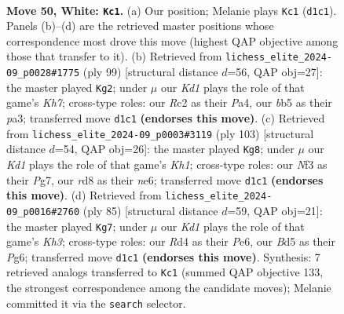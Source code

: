\documentclass[11pt]{article}
\begin{document}
\clearpage

\begin{figure}[p]\centering
\begin{subfigure}{0.46\textwidth}\centering
\resizebox{\linewidth}{!}{%
\newchessgame
\chessboard[
  setfen={3r4/k7/8/1b1B1p1N/1P1R4/4rN2/2R3P1/3K4 w - - 15 50},
  showmover=false,
  pgfstyle=straightmove, color=movearrow, markmove={d1-c1}
]}
\caption{}
\end{subfigure}\hfill
\begin{subfigure}{0.46\textwidth}\centering
\resizebox{\linewidth}{!}{%
\newchessgame
\chessboard[
  setfen={8/8/5R2/8/p1p4R/P1Pb2rp/7k/3K4 b - - 6 50},
  showmover=false,
  pgfstyle=straightmove, color=movearrow, markmove={h2-g2}
]}
\caption{}
\end{subfigure}
\\[4pt]
\begin{subfigure}{0.46\textwidth}\centering
\resizebox{\linewidth}{!}{%
\newchessgame
\chessboard[
  setfen={1R3b1k/5rp1/p3N3/3pn3/7P/8/3B1PK1/8 b - - 1 52},
  showmover=false,
  pgfstyle=straightmove, color=movearrow, markmove={h8-g8}
]}
\caption{}
\end{subfigure}\hfill
\begin{subfigure}{0.46\textwidth}\centering
\resizebox{\linewidth}{!}{%
\newchessgame
\chessboard[
  setfen={2R5/8/4pRpk/3pr3/8/1P6/3K1P2/4r3 b - - 3 43},
  showmover=false,
  pgfstyle=straightmove, color=movearrow, markmove={h6-g7}
]}
\caption{}
\end{subfigure}
\caption{\textbf{Move 50, White: \texttt{Kc1}.} (a) Our position; Melanie plays \texttt{Kc1} (\texttt{d1c1}). Panels (b)--(d) are the retrieved master positions whose correspondence most drove this move (highest QAP objective among those that transfer to it). (b) Retrieved from \texttt{lichess\_elite\_2024-09\_p0028\#1775} (ply 99) [structural distance $d$=56, QAP obj=27]: the master played \texttt{Kg2}; under $\mu$ our \emph{Kd1} plays the role of that game's \emph{Kh7}; cross-type roles: our \emph{R}c2 as their \emph{P}a4, our \emph{b}b5 as their \emph{p}a3; transferred move \texttt{d1c1} \textbf{(endorses this move)}. (c) Retrieved from \texttt{lichess\_elite\_2024-09\_p0003\#3119} (ply 103) [structural distance $d$=54, QAP obj=26]: the master played \texttt{Kg8}; under $\mu$ our \emph{Kd1} plays the role of that game's \emph{Kh1}; cross-type roles: our \emph{N}f3 as their \emph{P}g7, our \emph{r}d8 as their \emph{n}e6; transferred move \texttt{d1c1} \textbf{(endorses this move)}. (d) Retrieved from \texttt{lichess\_elite\_2024-09\_p0016\#2760} (ply 85) [structural distance $d$=59, QAP obj=21]: the master played \texttt{Kg7}; under $\mu$ our \emph{Kd1} plays the role of that game's \emph{Kh3}; cross-type roles: our \emph{R}d4 as their \emph{P}e6, our \emph{B}d5 as their \emph{P}g6; transferred move \texttt{d1c1} \textbf{(endorses this move)}. Synthesis: 7 retrieved analogs transferred to \texttt{Kc1} (summed QAP objective 133, the strongest correspondence among the candidate moves); Melanie committed it via the \texttt{search} selector.}
\label{fig:thought-m98}
\end{figure}
\end{document}
